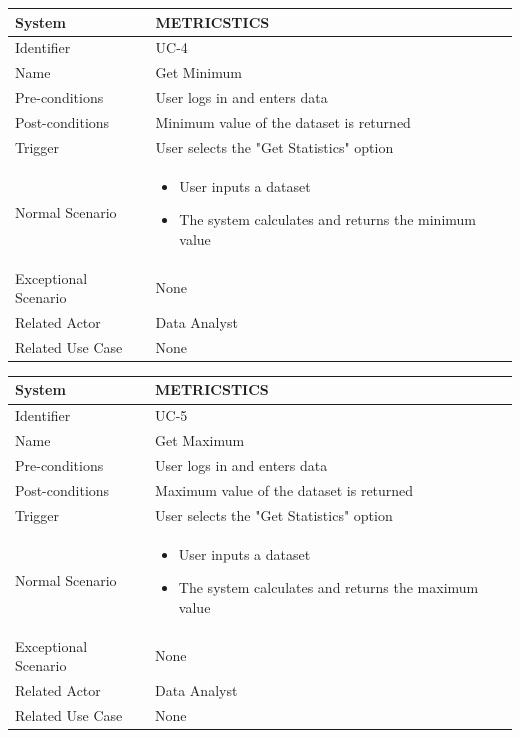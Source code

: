 \documentclass[letterpaper,12pt]{article}
\begin{document}
\begin{itemize}
\begin{tabular}{|p{1.45in}|p{3.65in}|}
    \hline
    System & METRICSTICS \\
    \hline
    Identifier & UC-4 \\
    \hline
    Name &  Get Minimum \\
    \hline
    Pre-conditions & User logs in and enters data\\
   \hline
    Post-conditions & Minimum value of the dataset is returned\\
   \hline
    Trigger & User selects the "Get Statistics" option \\
    \hline
    Normal Scenario &  \begin{itemize}
   \item User inputs a dataset
   \item The system calculates and returns the minimum value
   \end{itemize}\\
    \hline
    Exceptional Scenario & None \\
    \hline
    Related Actor& Data Analyst\\
    \hline
    Related Use Case & None\\
\hline
\end{tabular}
\bigskip
\bigskip

\begin{tabular}{|p{1.45in}|p{3.65in}|}
    \hline
    System & METRICSTICS \\
    \hline
    Identifier & UC-5 \\
    \hline
    Name &  Get Maximum \\
    \hline
    Pre-conditions & User logs in and enters data\\
   \hline
    Post-conditions & Maximum value of the dataset is returned\\
   \hline
    Trigger & User selects the "Get Statistics" option \\
    \hline
    Normal Scenario &  \begin{itemize}
   \item User inputs a dataset
   \item The system calculates and returns the maximum value
   \end{itemize}\\
    \hline
    Exceptional Scenario & None \\
    \hline
    Related Actor& Data Analyst\\
    \hline
    Related Use Case & None\\
\hline
\end{tabular}
\bigskip
\bigskip


\end{itemize}
\end{document}
